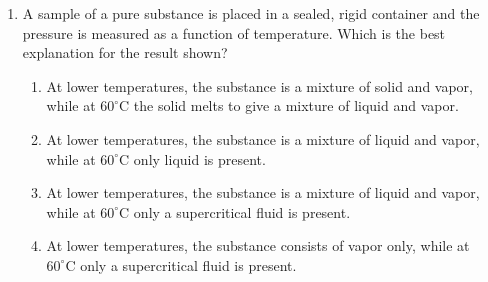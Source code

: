 \documentclass[twocolumn, 10pt]{article}
\begin{document}
\begin{enumerate}
    \begin{center}
    \end{center}
    \begin{enumerate}
        \item The molar heat capacity of solid A is greater than that of solid B.
        \item The molar heat capacity of liquid A is greater than that of liquid B.
        \item The melting point of A is less than that of B.
        \item The heat of fusion of A is less than that of B.
    \end{enumerate}

    \item A sample of a pure substance is placed in a sealed, rigid container and the pressure is measured as a function of temperature. Which is the best explanation for the result shown?
    
    \begin{center}
    \end{center}
    \begin{enumerate}
        \item At lower temperatures, the substance is a mixture of solid and vapor, while at $60^\circ\text{C}$ the solid melts to give a mixture of liquid and vapor.
        \item At lower temperatures, the substance is a mixture of liquid and vapor, while at $60^\circ\text{C}$ only liquid is present.
        \item At lower temperatures, the substance is a mixture of liquid and vapor, while at $60^\circ\text{C}$ only a supercritical fluid is present.
        \item At lower temperatures, the substance consists of vapor only, while at $60^\circ\text{C}$ only a supercritical fluid is present.
    \end{enumerate}


\end{enumerate}
\end{document}
